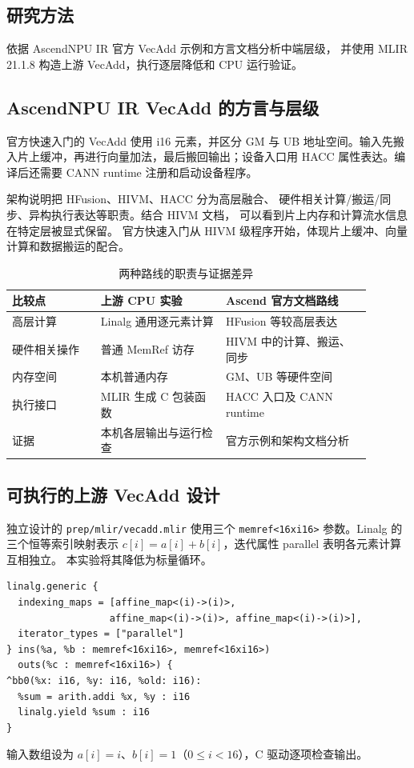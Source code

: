 \subsection{研究方法}
依据 AscendNPU IR 官方 VecAdd 示例和方言文档分析中端层级，
并使用 MLIR 21.1.8 构造上游 VecAdd，执行逐层降低和 CPU 运行验证。

\subsection{AscendNPU IR VecAdd 的方言与层级}
官方快速入门的 VecAdd 使用 i16 元素，并区分 GM 与 UB
地址空间。输入先搬入片上缓冲，再进行向量加法，最后搬回输出；设备入口用
HACC 属性表达。编译后还需要 CANN runtime 注册和启动设备程序。


架构说明把 HFusion、HIVM、HACC 分为高层融合、
硬件相关计算/搬运/同步、异构执行表达等职责。结合 HIVM 文档，
可以看到片上内存和计算流水信息在特定层被显式保留。
官方快速入门从 HIVM 级程序开始，体现片上缓冲、向量计算和数据搬运的配合。

\begin{table}[htbp]
\centering\small
\caption{两种路线的职责与证据差异}
\begin{tabular}{p{0.22\linewidth}p{0.31\linewidth}p{0.36\linewidth}}
\toprule
比较点 & 上游 CPU 实验 & Ascend 官方文档路线\\
\midrule
高层计算 & Linalg 通用逐元素计算 & HFusion 等较高层表达\\
硬件相关操作 & 普通 MemRef 访存 & HIVM 中的计算、搬运、同步\\
内存空间 & 本机普通内存 & GM、UB 等硬件空间\\
执行接口 & MLIR 生成 C 包装函数 & HACC 入口及 CANN runtime\\
证据 & 本机各层输出与运行检查 & 官方示例和架构文档分析\\
\bottomrule
\end{tabular}
\end{table}

\subsection{可执行的上游 VecAdd 设计}
独立设计的 \texttt{prep/mlir/vecadd.mlir} 使用三个
\texttt{memref<16xi16>} 参数。Linalg 的三个恒等索引映射表示
$c[i]=a[i]+b[i]$，迭代属性 parallel 表明各元素计算互相独立。
本实验将其降低为标量循环。
\par\vspace{0.7\baselineskip}\noindent\begin{minipage}[t]{\linewidth}
\begin{lstlisting}
linalg.generic {
  indexing_maps = [affine_map<(i)->(i)>,
                  affine_map<(i)->(i)>, affine_map<(i)->(i)>],
  iterator_types = ["parallel"]
} ins(%a, %b : memref<16xi16>, memref<16xi16>)
  outs(%c : memref<16xi16>) {
^bb0(%x: i16, %y: i16, %old: i16):
  %sum = arith.addi %x, %y : i16
  linalg.yield %sum : i16
}
\end{lstlisting}
\end{minipage}\par\vspace{0.5\baselineskip}
输入数组设为 $a[i]=i$、$b[i]=1$（$0\leq i<16$），C 驱动逐项检查输出。

